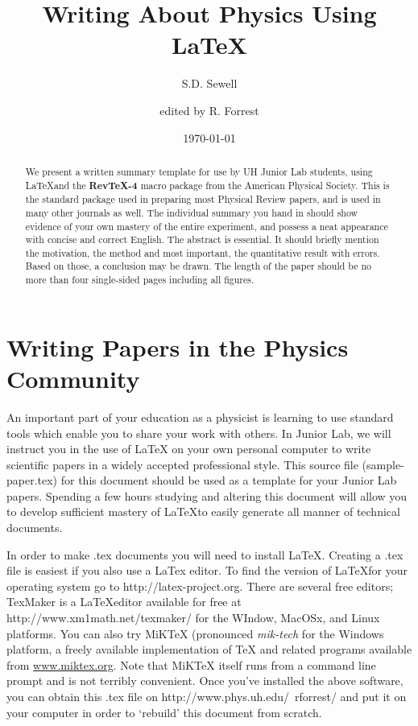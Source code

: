 \documentclass[aps,twocolumn,secnumarabic,nobalancelastpage,amsmath,amssymb,nofootinbib]{revtex4}
\begin{document}
\title{Writing About Physics Using \LaTeX}
\author         {S.D. Sewell}
\author    {edited by R. Forrest}
\date{\today}



\begin{abstract}

We present a written summary template for use by UH Junior Lab
students, using \LaTeX and the {\bf RevTeX-4} macro package from the
American Physical Society.  This is the standard package used in
preparing most Physical Review papers, and is used in many other
journals as well.  The individual summary you hand in should show
evidence of your own mastery of the entire experiment, and possess a
neat appearance with concise and correct English.  The abstract is
essential.  It should briefly mention the motivation, the method and
most important, the quantitative result with errors.  Based on
those, a conclusion may be drawn.  The length of the paper should be
no more than four single-sided pages including all figures.

\end{abstract}



\maketitle

\section{Writing Papers in the Physics Community}

An important part of your education as a physicist is learning to
use standard tools which enable you to share your work with
others. In Junior Lab, we will instruct you in the use of \LaTeX
 on your own personal computer to write scientific papers in
a widely accepted professional style. This source file
(sample-paper.tex) for this document should be used as a template
for your Junior Lab papers. Spending a few hours studying and
altering this document will allow you to develop sufficient
mastery of \LaTeX  to easily generate all manner of technical
documents.

In order to make .tex documents you will need to install \LaTeX.
Creating a .tex file is easiest if you also use a LaTex editor. To find 
the version of \LaTeX for your operating system go to http://latex-project.org.
There are several free editors; TexMaker is a \LaTeX editor 
available for free at http://www.xm1math.net/texmaker/ for the WIndow,
MacOSx, and Linux platforms. You 
can also try MiKTeX (pronounced \emph{mik-tech} for the Windows platform,
a freely available implementation of TeX and related programs
available from \url{www.miktex.org}. Note that MiKTeX itself runs
from a command line prompt and is not terribly convenient. Once you've installed 
the above software, you can obtain
this .tex file on http://www.phys.uh.edu/~rforrest/ and put it on your
computer in order to `rebuild' this document from scratch.  
\end{document}
